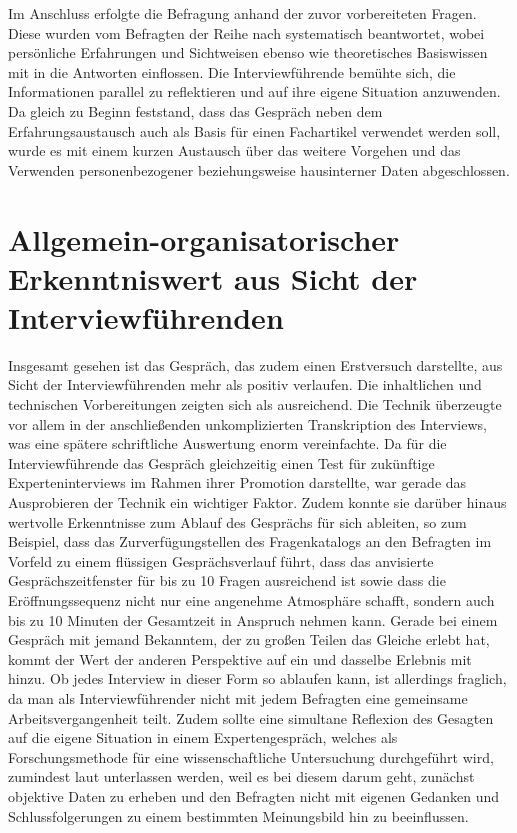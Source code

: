 \documentclass[a4paper,
fontsize=11pt,
oneside,
numbers=noperiodatend,
parskip=half-,
bibliography=totoc,
final
]{scrartcl}
\begin{document}
Im Anschluss erfolgte die Befragung anhand der zuvor vorbereiteten
Fragen. Diese wurden vom Befragten der Reihe nach systematisch
beantwortet, wobei persönliche Erfahrungen und Sichtweisen ebenso wie
theoretisches Basiswissen mit in die Antworten einflossen. Die
Interviewführende bemühte sich, die Informationen parallel zu
reflektieren und auf ihre eigene Situation anzuwenden. Da gleich zu
Beginn feststand, dass das Gespräch neben dem Erfahrungsaustausch auch
als Basis für einen Fachartikel verwendet werden soll, wurde es mit
einem kurzen Austausch über das weitere Vorgehen und das Verwenden
personenbezogener beziehungsweise hausinterner Daten abgeschlossen.

\section{Allgemein-organisatorischer Erkenntniswert aus Sicht der
Interviewführenden}\label{allgemein-organisatorischer-erkenntniswert-aus-sicht-der-interviewfuxfchrenden}

Insgesamt gesehen ist das Gespräch, das zudem einen Erstversuch
darstellte, aus Sicht der Interviewführenden mehr als positiv verlaufen.
Die inhaltlichen und technischen Vorbereitungen zeigten sich als
ausreichend. Die Technik überzeugte vor allem in der anschließenden
unkomplizierten Transkription des Interviews, was eine spätere
schriftliche Auswertung enorm vereinfachte. Da für die Interviewführende
das Gespräch gleichzeitig einen Test für zukünftige Experteninterviews
im Rahmen ihrer Promotion darstellte, war gerade das Ausprobieren der
Technik ein wichtiger Faktor. Zudem konnte sie darüber hinaus wertvolle
Erkenntnisse zum Ablauf des Gesprächs für sich ableiten, so zum
Beispiel, dass das Zurverfügungstellen des Fragenkatalogs an den
Befragten im Vorfeld zu einem flüssigen Gesprächsverlauf führt, dass das
anvisierte Gesprächszeitfenster für bis zu 10 Fragen ausreichend ist
sowie dass die Eröffnungssequenz nicht nur eine angenehme Atmosphäre
schafft, sondern auch bis zu 10 Minuten der Gesamtzeit in Anspruch
nehmen kann. Gerade bei einem Gespräch mit jemand Bekanntem, der zu
großen Teilen das Gleiche erlebt hat, kommt der Wert der anderen
Perspektive auf ein und dasselbe Erlebnis mit hinzu. Ob jedes Interview
in dieser Form so ablaufen kann, ist allerdings fraglich, da man als
Interviewführender nicht mit jedem Befragten eine gemeinsame
Arbeitsvergangenheit teilt. Zudem sollte eine simultane Reflexion des
Gesagten auf die eigene Situation in einem Expertengespräch, welches als
Forschungsmethode für eine wissenschaftliche Untersuchung durchgeführt
wird, zumindest laut unterlassen werden, weil es bei diesem darum geht,
zunächst objektive Daten zu erheben und den Befragten nicht mit eigenen
Gedanken und Schlussfolgerungen zu einem bestimmten Meinungsbild hin zu
beeinflussen.
\end{document}
